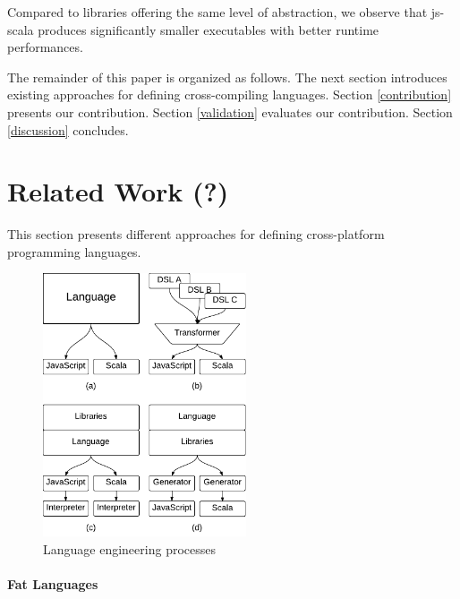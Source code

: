 \documentclass[preprint]{sigplanconf}
\begin{document}
Compared to libraries offering the same level of abstraction, we observe that js-scala produces significantly smaller
executables with better runtime performances.

The remainder of this paper is organized as follows. The next section introduces existing approaches for defining
cross-compiling languages. Section \ref{contribution} presents our contribution. Section \ref{validation} evaluates
our contribution. Section \ref{discussion} concludes.

\section{Related Work (?)}

This section presents different approaches for defining cross-platform programming languages.

\begin{figure}
\begin{center}
\includegraphics[width=6cm]{langs.pdf}
\end{center}
\caption{Language engineering processes}
\label{langs}
\end{figure}

\paragraph{Fat Languages}
\end{document}
